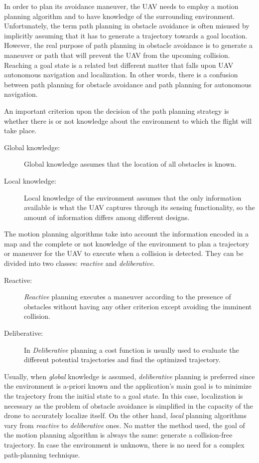 In order to plan its avoidance maneuver, the \ac{UAV} needs to employ a motion planning algorithm and to have knowledge of the surrounding environment. Unfortunately, the term path planning in obstacle avoidance is often misused by implicitly assuming that it has to generate a trajectory towards a goal location. However, the real purpose of path planning in obstacle avoidance is to generate a maneuver or path that will prevent the \ac{UAV} from the upcoming collision. Reaching a goal state is a related but different matter that falls upon \ac{UAV} autonomous navigation and localization. In other words, there is a confusion between path planning for obstacle avoidance and path planning for autonomous navigation. 

An important criterion upon the decision of the path planning strategy is whether there is or not knowledge about the environment to which the flight will take place. 

\begin{description}
	\item[Global knowledge: ] Global knowledge assumes that the location of all obstacles is known.
	\item[Local knowledge:] Local knowledge of the environment assumes that the only information available is what the UAV captures through its sensing functionality, so the amount of information differs among different designs. 
\end{description}

The motion planning algorithms take into account the information encoded in a map and the complete or not knowledge of the environment to plan a trajectory or maneuver for the \ac{UAV} to execute when a collision is detected. They can be divided into two classes: \textit{reactive} and \textit{deliberative}. 

\begin{description}
	\item[Reactive: ]\textit{Reactive }planning executes a maneuver according to the presence of obstacles without having any other criterion except avoiding the imminent collision.
	\item[Deliberative: ] In \textit{Deliberative} planning a cost function is usually used to evaluate the different potential trajectories and find the optimized trajectory.
\end{description}

Usually, when \textit{global} knowledge is assumed, \textit{deliberative} planning is preferred since the environment is a-priori known and the application's main goal is to minimize the trajectory from the initial state to a goal state. In this case, localization is necessary as the problem of obstacle avoidance is simplified in the capacity of the drone to accurately localize itself. On the other hand, \textit{local }planning algorithms vary from \textit{reactive} to \textit{deliberative }ones. No matter the method used, the goal of the motion planning algorithm is always the same: generate a collision-free trajectory. In case the environment is unknown, there is no need for a complex path-planning technique.

